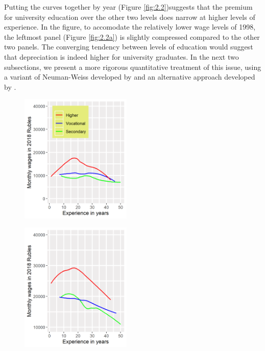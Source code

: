 \documentclass[alpha-refs]{wiley-article-02b}
\begin{document}
Putting the curves together by year (Figure \ref{fig:2.2})suggests that the premium for university education over the other two levels does narrow at higher levels of experience. In the figure, to accomodate the relatively lower wage levels of 1998, the leftmost panel (Figure \ref{fig:2.2a}) is slightly compressed compared to the other two panels. The  converging tendency between levels of education would suggest that depreciation is indeed higher for university graduates. In the next two subsections, we present a more rigorous quantitative treatment of this issue, using a variant of Neuman-Weiss developed by \citet{murillo_172._2006} and an alternative approach developed by \citet{arrazola_132b._2005}.

\begin{figure}[htbp!]
\hspace{0.35in}
		\begin{minipage}[b]{.3\linewidth}
			\centering
			\hspace*{-0.7in}
			\includegraphics[width=150pt]{dp01_98.png}
			\label{fig:2.2a}
		\end{minipage}
		\hfill
		\begin{minipage}[b]{.3\linewidth}
			\centering
			\hspace*{-0.7in}
			\includegraphics[width=150pt]{dp01_06.png}
			\label{fig:2.2b}

\end{minipage}
\end{figure}
\end{document}
